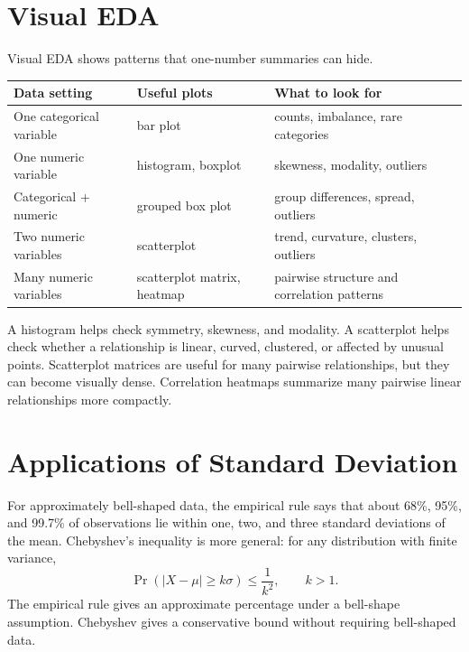 {\section{Visual EDA}

Visual EDA shows patterns that one-number summaries can hide.
\begin{center}
\begin{tabular}{p{}p{}p{}}
\toprule
\textbf{Data setting} & \textbf{Useful plots} & \textbf{What to look for} \\
\midrule
One categorical variable & bar plot & counts, imbalance, rare categories \\
One numeric variable & histogram, boxplot & skewness, modality, outliers \\
Categorical + numeric & grouped box plot & group differences, spread, outliers \\
Two numeric variables & scatterplot & trend, curvature, clusters, outliers \\
Many numeric variables & scatterplot matrix, heatmap & pairwise structure and correlation patterns \\
\bottomrule
\end{tabular}
\end{center}

A histogram helps check symmetry, skewness, and modality.  A scatterplot helps check whether a relationship is linear, curved, clustered, or affected by unusual points.  Scatterplot matrices are useful for many pairwise relationships, but they can become visually dense.  Correlation heatmaps summarize many pairwise linear relationships more compactly.

\section{Applications of Standard Deviation}

For approximately bell-shaped data, the empirical rule says that about 68\%, 95\%, and 99.7\% of observations lie within one, two, and three standard deviations of the mean.  Chebyshev's inequality is more general: for any distribution with finite variance,
\begin{equation}
  \Pr(|X-\mu|\ge k\sigma)\le \frac{1}{k^2},
  \qquad k>1.
  \label{eq:ch4-chebyshev}
\end{equation}
The empirical rule gives an approximate percentage under a bell-shape assumption.  Chebyshev gives a conservative bound without requiring bell-shaped data.

}
